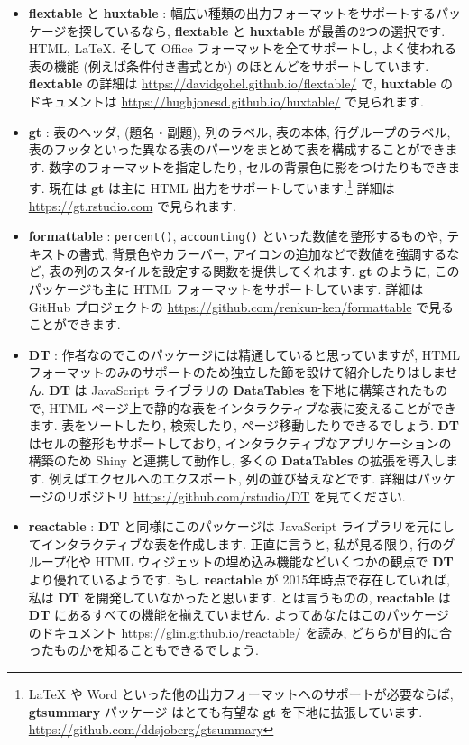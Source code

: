 \documentclass[
  11pt,
  lualatex,ja=standard,jafont=noto]{bxjsreport}
\begin{document}
\begin{itemize}
\item
  \textbf{flextable} \autocite{R-flextable} と \textbf{huxtable} \autocite{R-huxtable}: 幅広い種類の出力フォーマットをサポートするパッケージを探しているなら, \textbf{flextable} と \textbf{huxtable} が最善の2つの選択です. HTML, LaTeX. そして Office フォーマットを全てサポートし, よく使われる表の機能 (例えば条件付き書式とか) のほとんどをサポートしています. \textbf{flextable} の詳細は \url{https://davidgohel.github.io/flextable/} で, \textbf{huxtable} のドキュメントは \url{https://hughjonesd.github.io/huxtable/} で見られます.
\item
  \textbf{gt} \autocite{R-gt}: 表のヘッダ, (題名・副題), 列のラベル, 表の本体, 行グループのラベル, 表のフッタといった異なる表のパーツをまとめて表を構成することができます. 数字のフォーマットを指定したり, セルの背景色に影をつけたりもできます. 現在は \textbf{gt} は主に HTML 出力をサポートしています.\footnote{LaTeX や Word といった他の出力フォーマットへのサポートが必要ならば, \textbf{gtsummary} パッケージ \autocite{R-gtsummary} はとても有望な \textbf{gt} を下地に拡張しています. \url{https://github.com/ddsjoberg/gtsummary}} 詳細は \url{https://gt.rstudio.com} で見られます.
\item
  \textbf{formattable} \autocite{R-formattable}: \texttt{percent()}, \texttt{accounting()} といった数値を整形するものや, テキストの書式, 背景色やカラーバー, アイコンの追加などで数値を強調するなど, 表の列のスタイルを設定する関数を提供してくれます. \textbf{gt} のように, このパッケージも主に HTML フォーマットをサポートしています. 詳細は GitHub プロジェクトの \url{https://github.com/renkun-ken/formattable} で見ることができます.
\item
  \textbf{DT} \autocite{R-DT}: 作者なのでこのパッケージには精通していると思っていますが, HTML フォーマットのみのサポートのため独立した節を設けて紹介したりはしません. \textbf{DT} は JavaScript ライブラリの \textbf{DataTables} を下地に構築されたもので, HTML ページ上で静的な表をインタラクティブな表に変えることができます. 表をソートしたり, 検索したり, ページ移動したりできるでしょう. \textbf{DT} はセルの整形もサポートしており, インタラクティブなアプリケーションの構築のため Shiny と連携して動作し, 多くの \textbf{DataTables} の拡張を導入します. 例えばエクセルへのエクスポート, 列の並び替えなどです. 詳細はパッケージのリポジトリ \url{https://github.com/rstudio/DT} を見てください.
\item
  \textbf{reactable} \autocite{R-reactable}: \textbf{DT} と同様にこのパッケージは JavaScript ライブラリを元にしてインタラクティブな表を作成します. 正直に言うと, 私が見る限り, 行のグループ化や HTML ウィジェットの埋め込み機能などいくつかの観点で \textbf{DT} より優れているようです. もし \textbf{reactable} が 2015年時点で存在していれば, 私は \textbf{DT} を開発していなかったと思います. とは言うものの, \textbf{reactable} は\textbf{DT} にあるすべての機能を揃えていません. よってあなたはこのパッケージのドキュメント \url{https://glin.github.io/reactable/} を読み, どちらが目的に合ったものかを知ることもできるでしょう.

\end{itemize}
\end{document}
